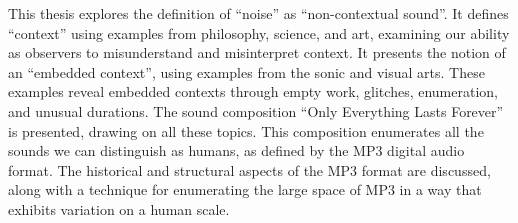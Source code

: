 \documentclass[chap]{thesis}
\begin{document}
             

\author{Kyle McDonald}        

\abstitlepage 
    

This thesis explores the definition of ``noise'' as ``non-contextual sound''. It defines ``context'' using examples from philosophy, science, and art, examining our ability as observers to misunderstand and misinterpret context. It presents the notion of an ``embedded context'', using examples from the sonic and visual arts. These examples reveal embedded contexts through empty work, glitches, enumeration, and unusual durations. The sound composition ``Only Everything Lasts Forever'' is presented, drawing on all these topics. This composition enumerates all the sounds we can distinguish as humans, as defined by the MP3 digital audio format. The historical and structural aspects of the MP3 format are discussed, along with a technique for enumerating the large space of MP3 in a way that exhibits variation on a human scale.
\end{document}
